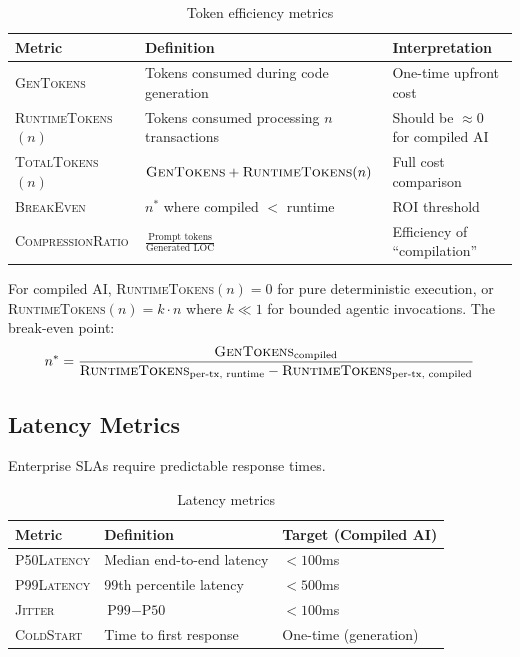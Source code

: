 \documentclass[11pt]{article}
\newcommand{\metric}[1]{\textsc{#1}}
\begin{document}
\begin{table}[ht]
\centering
\caption{Token efficiency metrics}
\label{tab:token-metrics}
\begin{tabular}{p{3.5cm}p{4cm}p{4.5cm}}
\toprule
Metric & Definition & Interpretation \\
\midrule
\metric{GenTokens} & Tokens consumed during code generation & One-time upfront cost \\
\metric{RuntimeTokens}$(n)$ & Tokens consumed processing $n$ transactions & Should be $\approx 0$ for compiled AI \\
\metric{TotalTokens}$(n)$ & $\text{\metric{GenTokens}} + \text{\metric{RuntimeTokens}}(n)$ & Full cost comparison \\
\metric{BreakEven} & $n^*$ where compiled $<$ runtime & ROI threshold \\
\metric{CompressionRatio} & $\frac{\text{Prompt tokens}}{\text{Generated LOC}}$ & Efficiency of ``compilation'' \\
\bottomrule
\end{tabular}
\end{table}

For compiled AI, \metric{RuntimeTokens}$(n) = 0$ for pure deterministic execution, or \metric{RuntimeTokens}$(n) = k \cdot n$ where $k \ll 1$ for bounded agentic invocations. The break-even point:
\begin{equation}
n^* = \frac{\text{\metric{GenTokens}}_{\text{compiled}}}{\text{\metric{RuntimeTokens}}_{\text{per-tx, runtime}} - \text{\metric{RuntimeTokens}}_{\text{per-tx, compiled}}}
\end{equation}

\subsection{Latency Metrics}

Enterprise SLAs require predictable response times.

\begin{table}[ht]
\centering
\caption{Latency metrics}
\label{tab:latency-metrics}
\begin{tabular}{p{3cm}p{5cm}p{4cm}}
\toprule
Metric & Definition & Target (Compiled AI) \\
\midrule
\metric{P50Latency} & Median end-to-end latency & $< 100$ms \\
\metric{P99Latency} & 99th percentile latency & $< 500$ms \\
\metric{Jitter} & $\text{P99} - \text{P50}$ & $< 100$ms \\
\metric{ColdStart} & Time to first response & One-time (generation) \\
\bottomrule
\end{tabular}
\end{table}
\end{document}
